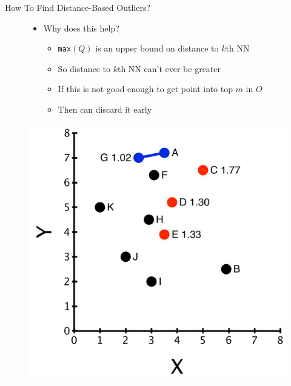\documentclass[aspectratio=169]{beamer}
\begin{document}
\begin{frame}{How To Find Distance-Based Outliers?}

\begin{figure}[ht]
\begin{minipage}[c]{0.4\linewidth}
\begin{itemize}
\item Why does this help?
	\begin{itemize}
	\item \texttt{max}$(Q)$ is an upper bound on distance to $k$th NN
	\item So distance to $k$th NN can't ever be greater
	\item If this is not good enough to get point into top $m$ in $O$
	\item Then can discard it early
	\end{itemize}
\end{itemize}
\end{minipage}
\hspace{0.5cm}
\begin{minipage}[c]{0.5\linewidth}
\includegraphics[width=\textwidth]{lectOutliers/outliersPtsLabeledBetterAlg.pdf}
\end{minipage}
\end{figure}
\end{frame}
\end{document}
